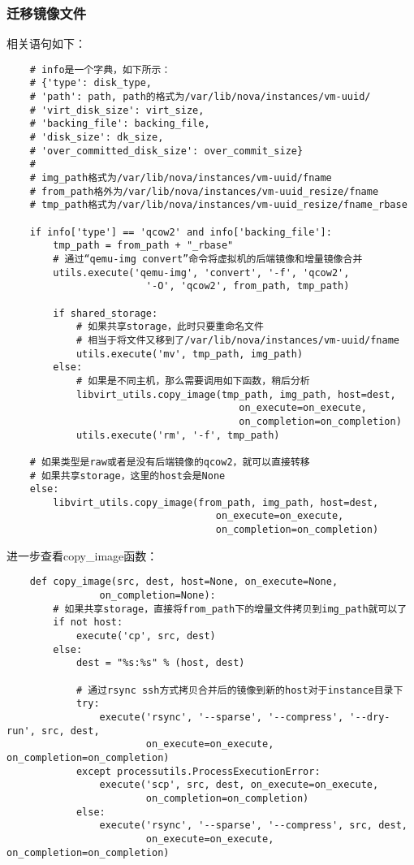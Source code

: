 \documentclass[a4paper,left=1.5cm,right=1.5cm,11pt]{article}
\begin{document}
\subsubsection{迁移镜像文件}
	相关语句如下：
	\begin{lstlisting}
	# info是一个字典，如下所示：
	# {'type': disk_type,
	# 'path': path, path的格式为/var/lib/nova/instances/vm-uuid/
	# 'virt_disk_size': virt_size,
	# 'backing_file': backing_file,
	# 'disk_size': dk_size,
	# 'over_committed_disk_size': over_commit_size}
	#
	# img_path格式为/var/lib/nova/instances/vm-uuid/fname
	# from_path格外为/var/lib/nova/instances/vm-uuid_resize/fname
	# tmp_path格式为/var/lib/nova/instances/vm-uuid_resize/fname_rbase

	if info['type'] == 'qcow2' and info['backing_file']:
		tmp_path = from_path + "_rbase"
		# 通过“qemu-img convert”命令将虚拟机的后端镜像和增量镜像合并
		utils.execute('qemu-img', 'convert', '-f', 'qcow2',
						'-O', 'qcow2', from_path, tmp_path)

		if shared_storage:
			# 如果共享storage，此时只要重命名文件
			# 相当于将文件又移到了/var/lib/nova/instances/vm-uuid/fname
			utils.execute('mv', tmp_path, img_path)
		else:
			# 如果是不同主机，那么需要调用如下函数，稍后分析
			libvirt_utils.copy_image(tmp_path, img_path, host=dest,
										on_execute=on_execute,
										on_completion=on_completion)
			utils.execute('rm', '-f', tmp_path)

	# 如果类型是raw或者是没有后端镜像的qcow2，就可以直接转移
	# 如果共享storage，这里的host会是None
	else:
		libvirt_utils.copy_image(from_path, img_path, host=dest,
									on_execute=on_execute,
									on_completion=on_completion)
	\end{lstlisting}

	进一步查看copy\_image函数：
	\begin{lstlisting}
	def copy_image(src, dest, host=None, on_execute=None,
				on_completion=None):
		# 如果共享storage，直接将from_path下的增量文件拷贝到img_path就可以了
		if not host:
			execute('cp', src, dest)
		else:
			dest = "%s:%s" % (host, dest)

			# 通过rsync ssh方式拷贝合并后的镜像到新的host对于instance目录下
			try:
				execute('rsync', '--sparse', '--compress', '--dry-run', src, dest,
						on_execute=on_execute, on_completion=on_completion)
			except processutils.ProcessExecutionError:
				execute('scp', src, dest, on_execute=on_execute,
						on_completion=on_completion)
			else:
				execute('rsync', '--sparse', '--compress', src, dest,
						on_execute=on_execute, on_completion=on_completion)
	\end{lstlisting}
\end{document}
